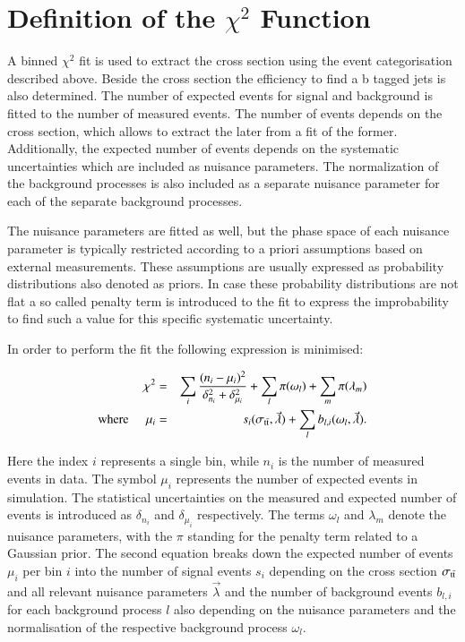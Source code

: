     
\section{Definition of the $\chi^2$ Function}
\label{sec:xsec_stat}

A binned $\chi^2$ fit is used to extract the \ttbar cross section using the event categorisation described above. Beside the \ttbar cross section the efficiency to find a b tagged jets is also determined.
The number of expected events for signal and background is fitted to the number of measured events. The number of \ttbar events depends on the \ttbar cross section, which allows to extract the later from a fit of the former.
Additionally, the expected number of \ttbar events depends on the systematic uncertainties which are included as nuisance parameters. The normalization of the background processes is also included as a separate nuisance parameter for each of the separate background processes.

The nuisance parameters are fitted as well, but the phase space of each nuisance parameter is typically restricted according
to a priori assumptions based on external measurements. These assumptions are usually expressed as probability distributions also denoted as priors.
In case these probability distributions are not flat a so called penalty term is introduced to the fit to express the improbability to find such a value for this specific systematic uncertainty.

In order to perform the fit the following expression is minimised:

\begin{eqnarray}
   \chi^2  &=& \sum_{i} \frac{(n_i-\mu_i)^2}{\delta_{n_i}^2+ \delta_{\mu_i}^2} + \sum_{l} \pi(\omega_l) + \sum_{m} \pi(\lambda_m) \\
 \mathrm{where} \; \; \; \; \; \mu_i &=& s_i(\sigma_\mathrm{t\bar{t}},\vec{\lambda}) + \sum_{l} b_{l,i}(\omega_l,\vec{\lambda}).
\label{eq:xsec_chisqfunct}
\end{eqnarray}

Here the index $i$ represents a single bin, while $n_i$ is the number of measured events in data. The symbol $\mu_i$ represents the number
of expected events in simulation. The statistical uncertainties on the measured and expected number of events is introduced as $\delta_{n_i}$ and $\delta_{\mu_i}$ respectively. The terms $\omega_l$ and $\lambda_m$
denote the nuisance parameters, with the $\pi$ standing for the penalty term related to a Gaussian prior.
The second equation breaks down the expected number of events $\mu_i$ per bin $i$ into the number of signal events $s_i$ depending on the \ttbar cross section $\sigma_\mathrm{t\bar{t}}$ and all relevant nuisance parameters $\vec{\lambda}$ and the number of
background events  $b_{l,i}$ for each background process $l$ also depending on the nuisance parameters and the normalisation of the respective background process $\omega_l$.

